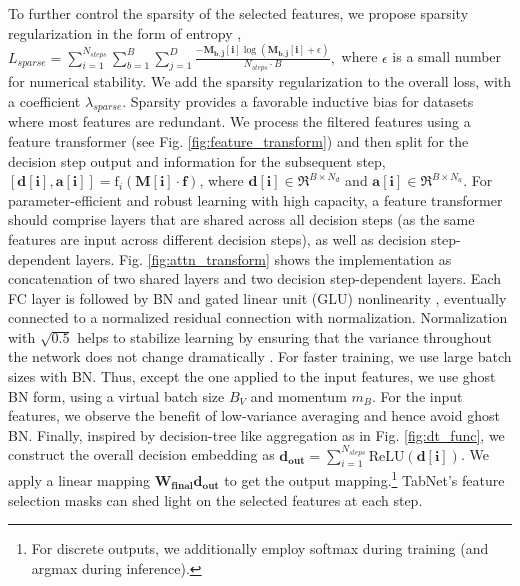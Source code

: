 To further control the sparsity of the selected features, we propose sparsity regularization in the form of entropy  \citep{entropy_ssl},
$L_{sparse} = \sum\nolimits_{i=1}^{N_{steps}} \sum\nolimits_{b=1}^{B} \sum\nolimits_{j=1}^{D} \frac{-\mathbf{M_{b,j}[i]} \log(\mathbf{M_{b,j}[i]} \! +\!  \epsilon)}{N_{steps} \cdot B},$
where $\epsilon$ is a small number for numerical stability. We add the sparsity regularization to the overall loss, with a coefficient $\lambda_{sparse}$. Sparsity provides a favorable inductive bias for datasets where most features are redundant.
\noindent{}
We process the filtered features using a feature transformer (see Fig. \ref{fig:feature_transform}) and then split for the decision step output and information for the subsequent step,
$[\mathbf{d[i]}, \mathbf{a[i]}] = \text{f}_i(\mathbf{M[i]} \cdot \mathbf{f})$,
where $\mathbf{d[i]} \in \Re ^ {B \times N_d}$ and $\mathbf{a[i]} \in \Re ^ {B \times N_a}$. For parameter-efficient and robust learning with high capacity, a feature transformer should comprise layers that are shared across all decision steps (as the same features are input across different decision steps), as well as decision step-dependent layers. Fig. \ref{fig:attn_transform} shows the implementation as concatenation of two shared layers and two decision step-dependent layers. Each FC layer is followed by BN and gated linear unit (GLU) nonlinearity \citep{glu},
eventually connected to a normalized residual connection with normalization. Normalization with $\sqrt{0.5}$ helps to stabilize learning by ensuring that the variance throughout the network does not change dramatically \citep{convseq2seq}. For faster training, we use large batch sizes with BN. Thus, except the one applied to the input features, we use ghost BN \citep{ghost_batch_norm} form, using a virtual batch size $B_V$ and momentum $m_B$. For the input features, we observe the benefit of low-variance averaging and hence avoid ghost BN. 
Finally, inspired by decision-tree like aggregation as in Fig. \ref{fig:dt_func}, we construct the overall decision embedding as $\mathbf{d_{out}} = \sum\nolimits_{i=1}^{N_{steps}} \text{ReLU}(\mathbf{d[i]})$.
We apply a linear mapping $\mathbf{W_{final}} \mathbf{d_{out}}$ to get the output mapping.\footnote{For discrete outputs, we additionally employ softmax during training (and argmax during inference).}
\noindent{}
TabNet's feature selection masks can shed light on the selected features at each step. 
